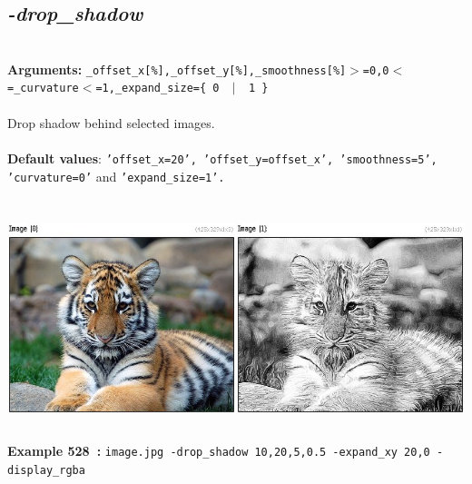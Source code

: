 \documentclass[a4paper,11pt,twoside]{book}
\begin{document}
\subsection{\emph{-drop\_shadow} }\vspace*{-0.5em}
~\\\textbf{Arguments: } 
{\small \texttt{\_offset\_x[\%],\_offset\_y[\%],\_smoothness[\%]$>$=0,0$<$=\_curvature$<$=1,\_expand\_size=\{ 0 ~$|$~ 1 \}}}\\~\\
Drop shadow behind selected images.
~\\~\\\textbf{Default values}: {\small \texttt{'offset\_x=20', 'offset\_y=offset\_x', 'smoothness=5', 'curvature=0'} and \texttt{'expand\_size=1'.}}
\begin{center}\includegraphics[keepaspectratio=true,height=7cm,width=\textwidth]{img/gmic_def528.jpg}\\
{\footnotesize \textbf{Example 528~:} \texttt{image.jpg -drop\_shadow 10,20,5,0.5 -expand\_xy 20,0 -display\_rgba}}
\end{center}
\end{document}

